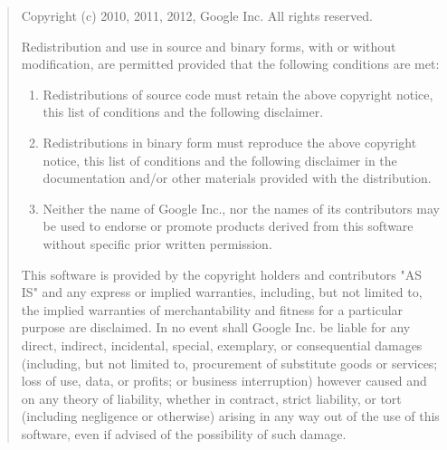 \begin{quotation}

\noindent
Copyright (c) 2010, 2011, 2012, Google Inc. All rights reserved.

\noindent
Redistribution and use in source and binary forms, with or without
modification, are permitted provided that the following conditions are met:
\begin{enumerate}
\item Redistributions of source code must retain the above copyright notice,
      this list of conditions and the following disclaimer.
\item Redistributions in binary form must reproduce the above copyright notice,
      this list of conditions and the following disclaimer in the documentation
      and/or other materials provided with the distribution.
\item Neither the name of Google Inc.,  nor the names of its contributors may
      be used to endorse or promote products derived from this software without
      specific prior written permission.
\end{enumerate}

\noindent
This software is provided by the copyright holders and contributors "AS IS" and
any express or implied warranties, including, but not limited to, the implied
warranties of merchantability and fitness for a particular purpose are
disclaimed. In no event shall Google Inc. be liable for any direct, indirect,
incidental, special, exemplary, or consequential damages (including, but not
limited to, procurement of substitute goods or services; loss of use, data, or
profits; or business interruption) however caused and on any theory of
liability, whether in contract, strict liability, or tort (including negligence
or otherwise) arising in any way out of the use of this software, even if
advised of the possibility of such damage.
\end{quotation}
